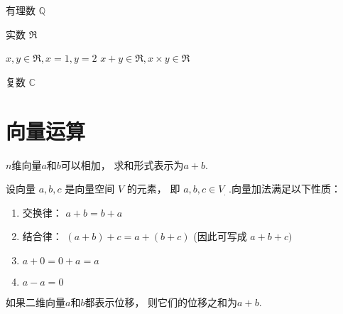 \begin{example}
    有理数 $ \mathbb{Q} $
\end{example}

\begin{example}
    实数 $ \mathfrak{R} $

    $ x, y \in \mathfrak{R}, x=1, y=2 $
    $ x+y \in \mathfrak{R}  ,x \times y \in \mathfrak{R} $
\end{example}

\begin{example}
    复数 $ \mathbb{C} $
\end{example}

\section{向量运算}

\begin{definition}[向量加法]
    $n$维向量$a$和$b$可以相加， 求和形式表示为$a + b$.
\end{definition}

\begin{theorem}
    设向量 $  a, {b}, {c}  $ 是向量空间 $  V  $ 的元素， 即 $  a, {b}, {c} \in V_{\text {.  }}  $.向量加法满足以下性质：

    \begin{enumerate}
        \item 交换律： $  a+b=b+a  $
        \item 结合律： $  (a+b)+c=a+(b+c)  $ (因此可写成 $  a+{b}+{c})  $
        \item $  a+0=0+a=a  $
        \item $  a-a=0  $
    \end{enumerate}
\end{theorem}

\begin{corollary}[向量位移相加]
    如果二维向量$a$和$b$都表示位移， 则它们的位移之和为$a + b$.
\end{corollary}

